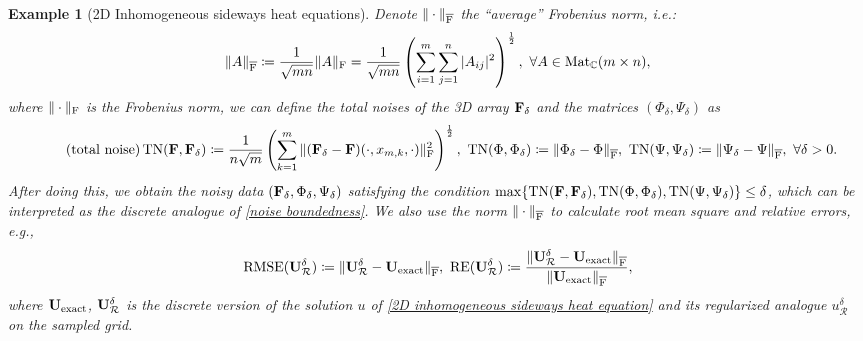 \documentclass[oneside]{article}
\numberwithin{equation}{section}
\newtheorem{example}{Example}[section]
\begin{document}
\begin{example}[2D Inhomogeneous sideways heat equations]
    Denote $\|\cdot\|_{\overline{\rm F}}$ the ``average'' Frobenius norm, i.e.:
    \begin{align*}
        \|A\|_{\overline{\rm F}}\coloneqq\frac{1}{\sqrt{mn}}\|A\|_{\rm F} = \frac{1}{\sqrt{mn}}\left(\sum_{i=1}^m\sum_{j=1}^n |A_{ij}|^2\right)^{\frac{1}{2}},\ \forall A\in\operatorname{Mat}_\mathbb{C}(m\times n),
    \end{align*}
    where $\|\cdot\|_{\rm F}$ is the Frobenius norm, we can define the total noises of the 3D array ${\bf F}_\delta$ and the matrices $(\Phi_\delta,\Psi_\delta)$ as
    \begin{align}
        \label{total noise}
        \tag{total noise}
        \operatorname{TN}({\bf F},{\bf F}_\delta)\coloneqq\frac{1}{n\sqrt{m}}\left(\sum_{k=1}^m \|({\bf F}_\delta - {\bf F})(\cdot,x_{m,k},\cdot)\|_{\rm F}^2\right)^{\frac{1}{2}},\ \operatorname{TN}(\Phi,\Phi_\delta)\coloneqq\|\Phi_\delta - \Phi\|_{\overline{\rm F}},\ \operatorname{TN}(\Psi,\Psi_\delta)\coloneqq\|\Psi_\delta - \Psi\|_{\overline{\rm F}},\ \forall\delta > 0.
    \end{align}
    After doing this, we obtain the noisy data $({\bf F}_\delta,\Phi_\delta,\Psi_\delta)$ satisfying the condition $\max\{\operatorname{TN}({\bf F},{\bf F}_\delta),\operatorname{TN}(\Phi,\Phi_\delta),\operatorname{TN}(\Psi,\Psi_\delta)\}\le\delta$, which can be interpreted as the discrete analogue of \eqref{noise boundedness}. We also use the norm $\|\cdot\|_{\overline{\rm F}}$ to calculate root mean square and relative errors, e.g.,
    \begin{align*}
        \operatorname{RMSE}({\bf U}_\mathcal{R}^\delta)\coloneqq\|{\bf U}_\mathcal{R}^\delta - {\bf U}_{\rm exact}\|_{\overline{\rm F}},\ \operatorname{RE}({\bf U}_\mathcal{R}^\delta)\coloneqq\frac{\|{\bf U}_\mathcal{R}^\delta - {\bf U}_{\rm exact}\|_{\overline{\rm F}}}{\|{\bf U}_{\rm exact}\|_{\overline{\rm F}}},
    \end{align*}
    where ${\bf U}_{\rm exact}$, ${\bf U}_\mathcal{R}^\delta$ is the discrete version of the solution $u$ of \eqref{2D inhomogeneous sideways heat equation} and its regularized analogue $u_\mathcal{R}^\delta$ on the sampled grid.
\end{example}
\end{document}
